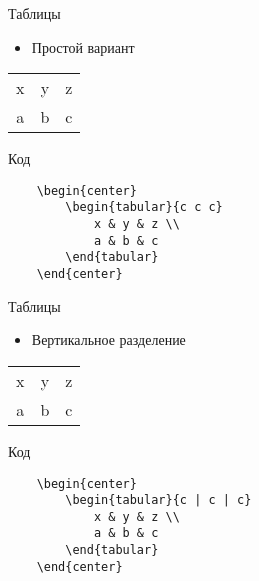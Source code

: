 
\begin{frame}[fragile]{Таблицы}

\begin{itemize}
    \item Простой вариант
\end{itemize}

\begin{center}
    \begin{tabular}{c c c}
        x & y & z \\
        a & b & c
    \end{tabular}
\end{center}

\begin{block}{Код}
    \begin{lstlisting}
    \begin{center}
        \begin{tabular}{c c c}
            x & y & z \\
            a & b & c
        \end{tabular}
    \end{center}
    \end{lstlisting}
\end{block}

\end{frame}


\begin{frame}[fragile]{Таблицы}

\begin{itemize}
    \item Вертикальное разделение
\end{itemize}

\begin{center}
    \begin{tabular}{c | c | c}
        x & y & z \\
        a & b & c
    \end{tabular}
\end{center}

\begin{block}{Код}
    \begin{lstlisting}
    \begin{center}
        \begin{tabular}{c | c | c}
            x & y & z \\
            a & b & c
        \end{tabular}
    \end{center}
    \end{lstlisting}
\end{block}

\end{frame}

